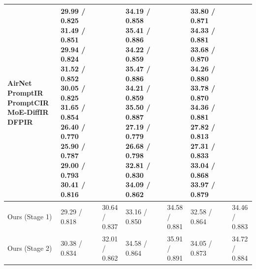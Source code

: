 \begin{tabular}{lllllll}
\toprule
AirNet PromptIR PromptCIR MoE-DiffIR DFPIR & 29.99 / 0.825 31.49 / 0.851 29.94 / 0.824 31.52 / 0.852 30.05 / 0.825 31.65 / 0.854 26.40 / 0.770 25.90 / 0.787 29.00 / 0.793 30.41 / 0.816 &  & 34.19 / 0.858 35.41 / 0.886 34.22 / 0.859 35.47 / 0.886 34.21 / 0.859 35.50 / 0.887 27.19 / 0.779 26.68 / 0.798 32.81 / 0.830 34.09 / 0.862 &  & 33.80 / 0.871 34.33 / 0.881 33.68 / 0.870 34.26 / 0.880 33.78 / 0.870 34.36 / 0.881 27.82 / 0.813 27.31 / 0.833 33.04 / 0.868 33.97 / 0.879 &  \\
\midrule
Ours (Stage 1) & 29.29 / 0.818 & 30.64 / 0.837 & 33.16 / 0.850 & 34.58 / 0.881 & 32.58 / 0.864 & 34.46 / 0.883 \\
Ours (Stage 2) & 30.38 / 0.834 & 32.01 / 0.862 & 34.58 / 0.864 & 35.91 / 0.891 & 34.05 / 0.873 & 34.72 / 0.884 \\
\bottomrule
\end{tabular}
